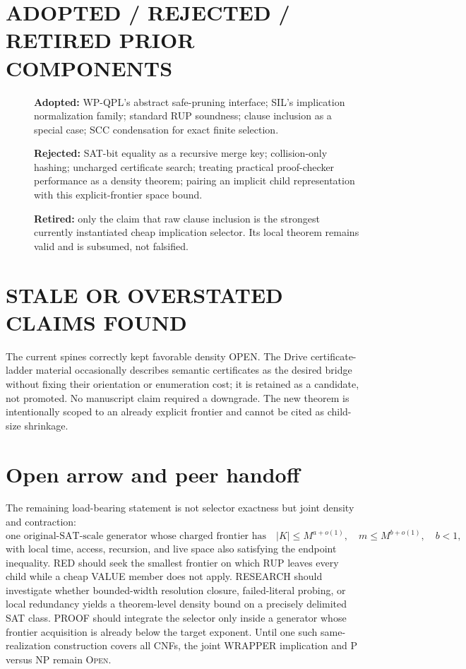 \documentclass[11pt]{article}
\begin{document}
\section*{ADOPTED / REJECTED / RETIRED PRIOR COMPONENTS}
\begin{description}
\item[] \textbf{Adopted:} WP-QPL's abstract safe-pruning interface; SIL's
implication normalization family; standard RUP soundness; clause inclusion as
a special case; SCC condensation for exact finite selection.
\item[] \textbf{Rejected:} SAT-bit equality as a recursive merge key;
collision-only hashing; uncharged certificate search; treating practical
proof-checker performance as a density theorem; pairing an implicit child
representation with this explicit-frontier space bound.
\item[] \textbf{Retired:} only the claim that raw clause inclusion is the
strongest currently instantiated cheap implication selector.  Its local
theorem remains valid and is subsumed, not falsified.
\end{description}

\section*{STALE OR OVERSTATED CLAIMS FOUND}
The current spines correctly kept favorable density OPEN.  The Drive
certificate-ladder material occasionally describes semantic certificates as
the desired bridge without fixing their orientation or enumeration cost; it
is retained as a candidate, not promoted.  No manuscript claim required a
downgrade.  The new theorem is intentionally scoped to an already explicit
frontier and cannot be cited as child-size shrinkage.

\section*{Open arrow and peer handoff}
The remaining load-bearing statement is not selector exactness but joint
density and contraction:
\[
\boxed{\text{one original-SAT-scale generator whose charged frontier has}
\quad |K|\le M^{a+o(1)},\quad m\le M^{b+o(1)},\quad b<1,}
\]
with local time, access, recursion, and live space also satisfying the endpoint
inequality.  RED should seek the smallest frontier on which RUP leaves every
child while a cheap VALUE member does not apply.  RESEARCH should investigate
whether bounded-width resolution closure, failed-literal probing, or local
redundancy yields a theorem-level density bound on a precisely delimited SAT
class.  PROOF should integrate the selector only inside a generator whose
frontier acquisition is already below the target exponent.  Until one such
same-realization construction covers all CNFs, the joint WRAPPER implication
and P versus NP remain \textsc{Open}.



\end{document}
